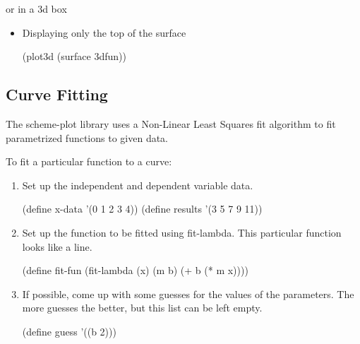 \documentclass{article}
\begin{document}
{\begin{itemize}
\begin{itemize}
\end{itemize}
or in a 3d box\begin{itemize}
\item Displaying only the top of the surface
\begin{schemedisplay}
(plot3d (surface 3dfun))
\end{schemedisplay}

\end{itemize}



\end{itemize}

\label{Curve Fitting}
\subsection{Curve Fitting}



The scheme-plot library uses a Non-Linear Least Squares fit algorithm 
       to fit parametrized functions to given data.


To fit a particular function to a curve:
\begin{enumerate}
\item Set up the independent and dependent variable data.
\begin{schemedisplay}

(define x-data '(0 1 2 3 4))
(define results '(3 5 7 9 11))
\end{schemedisplay}

\item Set up the function to be fitted using fit-lambda. This particular function
         looks like a line.
\begin{schemedisplay}

(define fit-fun 
 (fit-lambda (x) (m b) (+ b (* m x))))
\end{schemedisplay}

\item If possible, come up with some guesses for the values of the parameters.
         The more guesses the better, but this list can  be left empty.
\begin{schemedisplay}

(define guess '((b 2)))
\end{schemedisplay}


\end{enumerate}}
\end{document}

